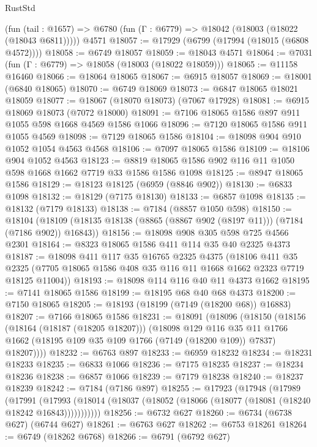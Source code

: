 \begin{lexlean}{RustStd}
\begin{coremodule}
    (fun (tail : @1657) => @6780 (fun (Γ : @6779) => @18042 (@18003 (@18022 (@18043 @6811)))))
    @4571
@18057 := @17929 (@6799 (@17994 (@18015 (@6808 @4572))))
@18058 := @6749 @18057
@18059 := @18043 @4571
@18064 := @7031 (fun (Γ : @6779) => @18058 (@18003 (@18022 @18059)))
@18065 := @11158 @16460
@18066 := @18064 @18065
@18067 := @6915 @18057
@18069 := @18001 (@6840 @18065)
@18070 := @6749 @18069
@18073 := @6847 @18065 @18021 @18059
@18077 := @18067 (@18070 @18073) (@7067 @17928)
@18081 := @6915 @18069 @18073 (@7072 @18000)
@18091 := @7106 @18065 @1586 @897 @911 @1055 @598 @1668 @4569 @1586 @1066
@18096 := @7120 @18065 @1586 @911 @1055 @4569
@18098 := @7129 @18065 @1586
@18104 := @18098 @904 @910 @1052 @1054 @4563 @4568
@18106 := @7097 @18065 @1586
@18109 := @18106 @904 @1052 @4563
@18123 := @8819 @18065 @1586 @902 @116 @11 @1050 @598 @1668 @1662 @7719 @33 @1586 @1586 @1098
@18125 := @8947 @18065 @1586
@18129 := @18123 @18125 (@6959 (@8846 @902))
@18130 := @6833 @1098
@18132 := @18129 (@7175 @18130)
@18133 := @6857 @1098
@18135 := @18132 (@7179 @18133)
@18138 := @7184 (@8857 @1050 @598)
@18150 := @18104
    (@18109 (@18135 @18138 (@8865 (@8867 @902 (@8197 @11))) (@7184 (@7186 @902)) @16843))
@18156 := @18098 @908 @305 @598 @725 @4566 @2301
@18164 := @8323 @18065 @1586 @411 @114 @35 @40 @2325 @4373
@18187 := @18098
    @411
    @117
    @35
    @16765
    @2325
    @4375
    (@18106
      @411
      @35
      @2325
      (@7705 @18065 @1586 @408 @35 @116 @11 @1668 @1662 @2323 @7719 @18125 @11004))
@18193 := @18098 @114 @116 @40 @11 @4373 @1662
@18195 := @7141 @18065 @1586
@18199 := @18195 @68 @40 @68 @4373
@18200 := @7150 @18065
@18205 := @18193 (@18199 (@7149 (@18200 @68)) @16883)
@18207 := @7166 @18065 @1586
@18231 := @18091
    (@18096
      (@18150
        (@18156
          (@18164 (@18187 (@18205 @18207)))
          (@18098
            @129
            @116
            @35
            @11
            @1766
            @1662
            (@18195 @109 @35 @109 @1766 (@7149 (@18200 @109)) @7837)
            @18207))))
@18232 := @6763 @897
@18233 := @6959 @18232
@18234 := @18231 @18233
@18235 := @6833 @1066
@18236 := @7175 @18235
@18237 := @18234 @18236
@18238 := @6857 @1066
@18239 := @7179 @18238
@18240 := @18237 @18239
@18242 := @7184 (@7186 @897)
@18255 := @17923
    (@17948
      (@17989
        (@17991
          (@17993 (@18014 (@18037 (@18052 (@18066 (@18077 (@18081 (@18240 @18242 @16843)))))))))))
@18256 := @6732 @627
@18260 := @6734 (@6738 @627) (@6744 @627)
@18261 := @6763 @627
@18262 := @6753 @18261
@18264 := @6749 (@18262 @6768)
@18266 := @6791 (@6792 @627)

\end{coremodule}
\end{lexlean}
